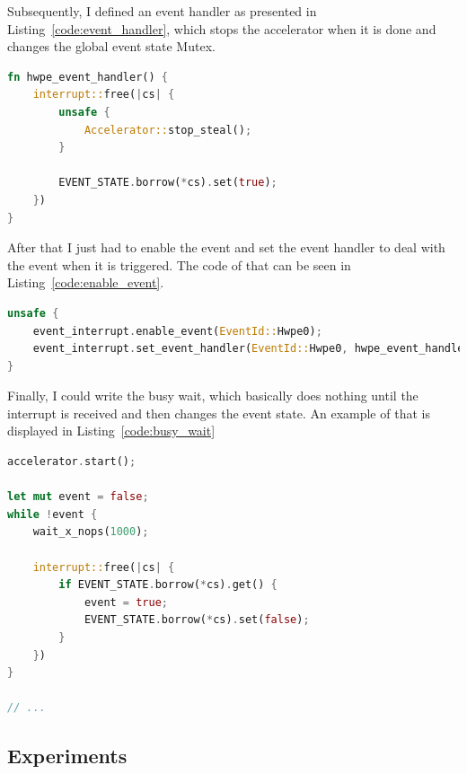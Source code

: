 Subsequently, I defined an event handler as presented in Listing~\ref{code:event_handler}, which
stops the accelerator when it is done and changes the global event state Mutex.

\begin{minipage}{\textwidth}
\begin{lstlisting}[style=colorEX,language=Rust,caption={Event handler function},label={code:event_handler}]
fn hwpe_event_handler() {
    interrupt::free(|cs| {
        unsafe {
            Accelerator::stop_steal();
        }

        EVENT_STATE.borrow(*cs).set(true);
    })
}
\end{lstlisting}
\end{minipage}

After that I just had to enable the event and set the event handler to deal with the event when it is triggered.
The code of that can be seen in Listing~\ref{code:enable_event}.

\begin{minipage}{\textwidth}
\begin{lstlisting}[style=colorEX,language=Rust,caption={Code to enable the hardware event and set the handler},label={code:enable_event}]
unsafe {
    event_interrupt.enable_event(EventId::Hwpe0);
    event_interrupt.set_event_handler(EventId::Hwpe0, hwpe_event_handler);
}
\end{lstlisting}
\end{minipage}

Finally, I could write the busy wait, which basically does nothing until the interrupt is received
and then changes the event state.
An example of that is displayed in Listing~\ref{code:busy_wait}

\begin{minipage}{\textwidth}
\begin{lstlisting}[style=colorEX,language=Rust,caption={Snippet of the busy wait that waits for UltraTrail to finish},label={code:busy_wait}]
accelerator.start();

let mut event = false;
while !event {
    wait_x_nops(1000);

    interrupt::free(|cs| {
        if EVENT_STATE.borrow(*cs).get() {
            event = true;
            EVENT_STATE.borrow(*cs).set(false);
        }
    })
}

// ...
\end{lstlisting}
\end{minipage}

\subsection{Experiments}

